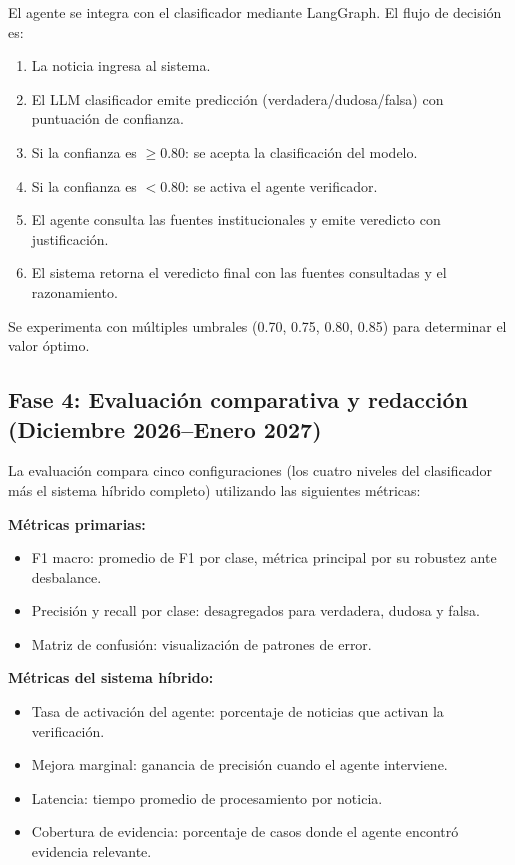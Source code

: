 El agente se integra con el clasificador mediante LangGraph. El flujo de decisión es:

\begin{enumerate}
    \item La noticia ingresa al sistema.
    \item El LLM clasificador emite predicción (verdadera/dudosa/falsa) con puntuación de confianza.
    \item Si la confianza es $\geq 0.80$: se acepta la clasificación del modelo.
    \item Si la confianza es $< 0.80$: se activa el agente verificador.
    \item El agente consulta las fuentes institucionales y emite veredicto con justificación.
    \item El sistema retorna el veredicto final con las fuentes consultadas y el razonamiento.
\end{enumerate}

Se experimenta con múltiples umbrales (0.70, 0.75, 0.80, 0.85) para determinar el valor óptimo.

\subsection{Fase 4: Evaluación comparativa y redacción (Diciembre 2026--Enero 2027)}

La evaluación compara cinco configuraciones (los cuatro niveles del clasificador más el sistema híbrido completo) utilizando las siguientes métricas:

\textbf{Métricas primarias:}
\begin{itemize}
    \item F1 macro: promedio de F1 por clase, métrica principal por su robustez ante desbalance.
    \item Precisión y recall por clase: desagregados para verdadera, dudosa y falsa.
    \item Matriz de confusión: visualización de patrones de error.
\end{itemize}

\textbf{Métricas del sistema híbrido:}
\begin{itemize}
    \item Tasa de activación del agente: porcentaje de noticias que activan la verificación.
    \item Mejora marginal: ganancia de precisión cuando el agente interviene.
    \item Latencia: tiempo promedio de procesamiento por noticia.
    \item Cobertura de evidencia: porcentaje de casos donde el agente encontró evidencia relevante.
\end{itemize}

